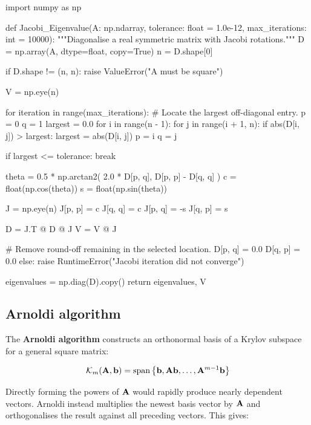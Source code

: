 \begin{python}
import numpy as np


def Jacobi_Eigenvalue(A: np.ndarray,
                      tolerance: float = 1.0e-12,
                      max_iterations: int = 10000):
    """Diagonalise a real symmetric matrix with Jacobi rotations."""
    D = np.array(A, dtype=float, copy=True)
    n = D.shape[0]

    if D.shape != (n, n):
        raise ValueError("A must be square")

    V = np.eye(n)

    for iteration in range(max_iterations):
        # Locate the largest off-diagonal entry.
        p = 0
        q = 1
        largest = 0.0
        for i in range(n - 1):
            for j in range(i + 1, n):
                if abs(D[i, j]) > largest:
                    largest = abs(D[i, j])
                    p = i
                    q = j

        if largest <= tolerance:
            break

        theta = 0.5 * np.arctan2(
            2.0 * D[p, q], D[p, p] - D[q, q]
        )
        c = float(np.cos(theta))
        s = float(np.sin(theta))

        J = np.eye(n)
        J[p, p] = c
        J[q, q] = c
        J[p, q] = -s
        J[q, p] = s

        D = J.T @ D @ J
        V = V @ J

        # Remove round-off remaining in the selected location.
        D[p, q] = 0.0
        D[q, p] = 0.0
    else:
        raise RuntimeError("Jacobi iteration did not converge")

    eigenvalues = np.diag(D).copy()
    return eigenvalues, V
\end{python}

\subsection{Arnoldi algorithm}

The \textbf{Arnoldi algorithm} constructs an orthonormal basis of a Krylov
subspace for a general square matrix:

\begin{equation}
    \mathcal{K}_m(\mathbf{A},\mathbf{b})=
    \operatorname{span}\left\{
        \mathbf{b},\mathbf{A}\mathbf{b},\dots,\mathbf{A}^{m-1}\mathbf{b}
    \right\}
\end{equation}

Directly forming the powers of $ \mathbf{A} $ would rapidly produce nearly dependent
vectors. Arnoldi instead multiplies the newest basis vector by $ \mathbf{A} $ and
orthogonalises the result against all preceding vectors. This gives:

